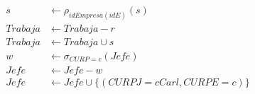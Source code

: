 \documentclass{article}
\begin{document}
\begin{enumerate}
{{\begin{enumerate}
{\begin{enumerate}
\begin{align*}
                        	s & \leftarrow \rho_{idEmpresa(idE)}(s)\\
                        	Trabaja & \leftarrow Trabaja - r\\
                        	Trabaja & \leftarrow Trabaja \cup s\\
                        	w & \leftarrow \sigma_{CURP = c} (Jefe)\\
                        	Jefe & \leftarrow Jefe - w\\
                        	Jefe & \leftarrow Jefe \cup \{(CURPJ = cCarl, CURPE = c)\} \\                           	
                        	\end{align*}
                        \end{enumerate}
                        
                    }
                \end{enumerate}
            }
        }
    \end{enumerate}
\end{document}
